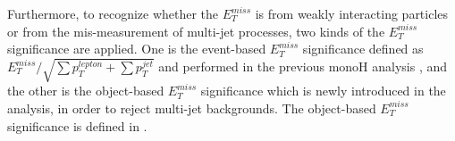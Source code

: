 \documentclass[class=NTHU_thesis, crop=false]{standalone}
\begin{document}
Furthermore, to recognize whether the $E^{miss}_T$ is from weakly interacting particles or from the mis-measurement of multi-jet processes, two kinds of the $E^{miss}_T$ significance are applied. One is the event-based $E^{miss}_T$ significance defined as $E^{miss}_T/\sqrt{{\sum}p^{lepton}_T+{\sum}p^{jet}_T}$ and performed in the previous monoH analysis \cite{PhysRevLett.119.181804}, and the other is the object-based $E^{miss}_T$ significance which is newly introduced in the analysis, in order to reject multi-jet backgrounds. The object-based $E^{miss}_T$ significance is defined in \cite{ATLAS-CONF-2018-038}.
\end{document}
